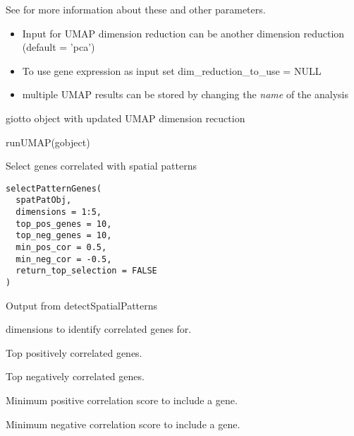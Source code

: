 \documentclass[a4paper]{book}
\begin{document}
%
\begin{Details}\relax
See  for more information about these and other parameters.
\begin{itemize}

\item{} Input for UMAP dimension reduction can be another dimension reduction (default = 'pca')
\item{} To use gene expression as input set dim\_reduction\_to\_use = NULL
\item{} multiple UMAP results can be stored by changing the \emph{name} of the analysis

\end{itemize}

\end{Details}
%
\begin{Value}
giotto object with updated UMAP dimension recuction
\end{Value}
%
\begin{Examples}
\begin{ExampleCode}
    runUMAP(gobject)
\end{ExampleCode}
\end{Examples}
%
\begin{Description}\relax
Select genes correlated with spatial patterns
\end{Description}
%
\begin{Usage}
\begin{verbatim}
selectPatternGenes(
  spatPatObj,
  dimensions = 1:5,
  top_pos_genes = 10,
  top_neg_genes = 10,
  min_pos_cor = 0.5,
  min_neg_cor = -0.5,
  return_top_selection = FALSE
)
\end{verbatim}
\end{Usage}
%
\begin{Arguments}
\begin{ldescription}
\item[\code{spatPatObj}] Output from detectSpatialPatterns

\item[\code{dimensions}] dimensions to identify correlated genes for.

\item[\code{top\_pos\_genes}] Top positively correlated genes.

\item[\code{top\_neg\_genes}] Top negatively correlated genes.

\item[\code{min\_pos\_cor}] Minimum positive correlation score to include a gene.

\item[\code{min\_neg\_cor}] Minimum negative correlation score to include a gene.
\end{ldescription}
\end{Arguments}
\end{document}
